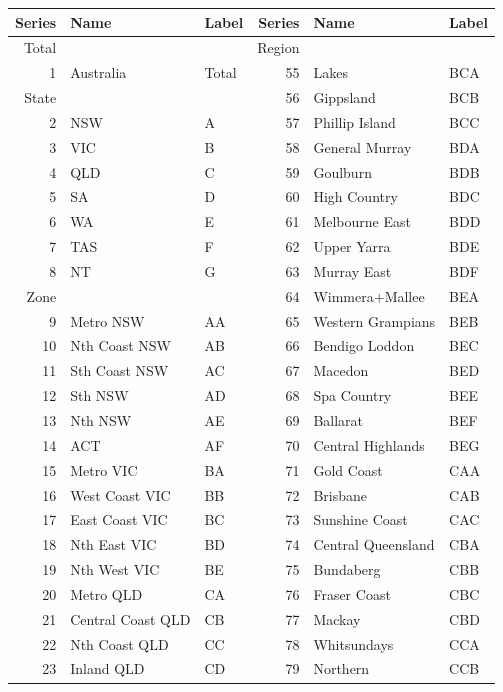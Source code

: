 \documentclass[11pt,a4paper,]{article}
\let\origtable\table
\let\endorigtable\endtable
\renewenvironment{table}[1][2] {
    \expandafter\origtable\expandafter[htbp]
} {
    \endorigtable
}
\begin{document}
\begin{table}[t]

\caption{\label{tab:Australiageographicaldivision}Australia geographic hierarchy structure}
\centering
\fontsize{9}{11}\selectfont
\begin{tabular}{rllrll}
\toprule
Series & Name & Label & Series & Name & Label\\
\midrule
Total &  &  & Region &  & \\
1 & Australia & Total & 55 & Lakes & BCA\\
State &  &  & 56 & Gippsland & BCB\\
2 & NSW & A & 57 & Phillip Island & BCC\\
3 & VIC & B & 58 & General Murray & BDA\\
4 & QLD & C & 59 & Goulburn & BDB\\
5 & SA & D & 60 & High Country & BDC\\
6 & WA & E & 61 & Melbourne East & BDD\\
7 & TAS & F & 62 & Upper Yarra & BDE\\
8 & NT & G & 63 & Murray East & BDF\\
Zone &  &  & 64 & Wimmera+Mallee & BEA\\
9 & Metro NSW & AA & 65 & Western Grampians & BEB\\
10 & Nth Coast NSW & AB & 66 & Bendigo Loddon & BEC\\
11 & Sth Coast NSW & AC & 67 & Macedon & BED\\
12 & Sth NSW & AD & 68 & Spa Country & BEE\\
13 & Nth NSW & AE & 69 & Ballarat & BEF\\
14 & ACT & AF & 70 & Central Highlands & BEG\\
15 & Metro VIC & BA & 71 & Gold Coast & CAA\\
16 & West Coast VIC & BB & 72 & Brisbane & CAB\\
17 & East Coast VIC & BC & 73 & Sunshine Coast & CAC\\
18 & Nth East VIC & BD & 74 & Central Queensland & CBA\\
19 & Nth West VIC & BE & 75 & Bundaberg & CBB\\
20 & Metro QLD & CA & 76 & Fraser Coast & CBC\\
21 & Central Coast QLD & CB & 77 & Mackay & CBD\\
22 & Nth Coast QLD & CC & 78 & Whitsundays & CCA\\
23 & Inland QLD & CD & 79 & Northern & CCB\\

\end{tabular}
\end{table}
\end{document}

